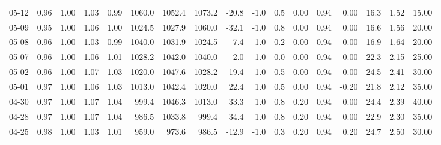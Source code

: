 \begin{threeparttable}
{\begin{tabular}{lrrrrrrrrrrrrrrrr}
  05-12 &         0.96 &           1.00 &          1.03 &          0.99 & 1060.0 & 1052.4 & 1073.2 &      -20.8 &                     -1.0 &                 0.5 &       0.00 &      0.94 &           0.00 &             16.3 &            1.52 &                  15.00 \\
  05-09 &         0.95 &           1.00 &          1.06 &          1.00 & 1024.5 & 1027.9 & 1060.0 &      -32.1 &                     -1.0 &                 0.8 &       0.00 &      0.94 &           0.00 &             16.6 &            1.56 &                  20.00 \\
  05-08 &         0.96 &           1.00 &          1.03 &          0.99 & 1040.0 & 1031.9 & 1024.5 &        7.4 &                      1.0 &                 0.2 &       0.00 &      0.94 &           0.00 &             16.9 &            1.64 &                  20.00 \\
  05-07 &         0.96 &           1.00 &          1.06 &          1.01 & 1028.2 & 1042.0 & 1040.0 &        2.0 &                      1.0 &                 0.0 &       0.00 &      0.94 &           0.00 &             22.3 &            2.15 &                  25.00 \\
  05-02 &         0.96 &           1.00 &          1.07 &          1.03 & 1020.0 & 1047.6 & 1028.2 &       19.4 &                      1.0 &                 0.5 &       0.00 &      0.94 &           0.00 &             24.5 &            2.41 &                  30.00 \\
  05-01 &         0.97 &           1.00 &          1.06 &          1.03 & 1013.0 & 1042.4 & 1020.0 &       22.4 &                      1.0 &                 0.5 &       0.00 &      0.94 &          -0.20 &             21.8 &            2.12 &                  35.00 \\
  04-30 &         0.97 &           1.00 &          1.07 &          1.04 &  999.4 & 1046.3 & 1013.0 &       33.3 &                      1.0 &                 0.8 &       0.20 &      0.94 &           0.00 &             24.4 &            2.39 &                  40.00 \\
  04-28 &         0.97 &           1.00 &          1.07 &          1.04 &  986.5 & 1033.8 &  999.4 &       34.4 &                      1.0 &                 0.8 &       0.20 &      0.94 &           0.00 &             22.9 &            2.30 &                  35.00 \\
  04-25 &         0.98 &           1.00 &          1.03 &          1.01 &  959.0 &  973.6 &  986.5 &      -12.9 &                     -1.0 &                 0.3 &       0.20 &      0.94 &           0.20 &             24.7 &            2.50 &                  30.00 \\

\end{tabular}}
\end{threeparttable}
